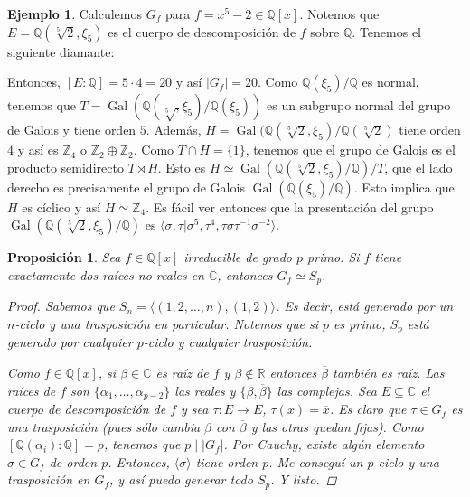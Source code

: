 \documentclass[12pt]{book}
\newtheorem{prop}[teo]{Proposición}
\theoremstyle{definition}
\newtheorem{ex}[teo]{Ejemplo}
\newcommand{\CC}{\mathbb{C}}
\newcommand{\RR}{\mathbb{R}}      %
\newcommand{\ZZ}{\mathbb{Z}}      %
\newcommand{\QQ}{\mathbb{Q}}
\DeclareMathOperator{\Gal}{Gal}
\begin{document}
\begin{ex}
Calculemos $G_f$ para $f=x^5 - 2\in\QQ[x]$. Notemos que $E=\QQ(\sqrt[5]{2},\xi_5)$ es el cuerpo de descomposición de $f$ sobre $\QQ$. Tenemos el siguiente diamante: 
\begin{center}
\end{center}
Entonces, $[E:\QQ]=5\cdot 4 = 20$ y así $|G_f|=20$. Como $\QQ(\xi_5)/\QQ$ es normal, tenemos que $T=\Gal(\QQ(\sqrt[5],\xi_5)/\QQ(\xi_5))$ es un subgrupo normal del grupo de Galois y tiene orden $5$. Además, $H=\Gal(\QQ(\sqrt[5]{2},\xi_5)/\QQ(\sqrt[5]{2})$ tiene orden $4$ y así es $\ZZ_4$ o $\ZZ_2\oplus\ZZ_2$. Como $T\cap H = \{1\}$, tenemos que el grupo de Galois es el producto semidirecto $T\rtimes H$. Esto es $H\simeq \Gal(\QQ(\sqrt[5]{2},\xi_5)/\QQ)/T$, que el lado derecho es precisamente el grupo de Galois $\Gal(\QQ(\xi_5)/\QQ)$. Esto implica que $H$ es cíclico y así $H\simeq \ZZ_4$. Es fácil ver entonces que la presentación del grupo $\Gal(\QQ(\sqrt[5]{2},\xi_5)/\QQ)$ es $\langle \sigma,\tau | \sigma^5, \tau^4, \tau\sigma\tau^{-1}\sigma^{-2} \rangle$.
\end{ex}

\begin{prop}
Sea $f\in\QQ[x]$ irreducible de grado $p$ primo. Si $f$ tiene exactamente dos raíces no reales en $\CC$, entonces $G_f\simeq S_p$.
\begin{proof}
Sabemos que $S_n = \langle (1,2,\ldots , n),(1,2)\rangle$. Es decir, está generado por un $n$-ciclo y una trasposición en particular. Notemos que si $p$ es primo, $S_p$ está generado por cualquier $p$-ciclo y cualquier trasposición. 

Como $f\in\QQ[x]$, si $\beta\in\CC$ es raíz de $f$ y $\beta\notin\RR$ entonces $\overline{\beta}$ también es raíz. Las raíces de $f$ son $\{\alpha_1,\ldots ,\alpha_{p-2}\}$ las reales y $\{\beta,\overline{\beta}\}$ las complejas. Sea $E\subseteq\CC$ el cuerpo de descomposición de $f$ y sea $\tau:E\to E$, $\tau(x)=\overline{x}$. Es claro que $\tau\in G_f$ es una trasposición (pues sólo cambia $\beta$ con $\overline{\beta}$ y las otras quedan fijas). Como $[\QQ(\alpha_i):\QQ]=p$, tenemos que $p\mid |G_f|$. Por Cauchy, existe algún elemento $\sigma\in G_f$ de orden $p$. Entonces, $\langle \sigma\rangle$ tiene orden $p$. Me conseguí un $p$-ciclo y una trasposición en $G_f$, y así puedo generar todo $S_p$. Y listo.
\end{proof}
\end{prop}
\end{document}
